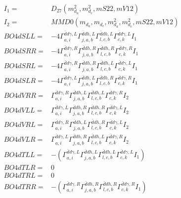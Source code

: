 \documentclass[A4,landscape]{article}
\begin{document}
\begin{align} 
I_1 = & D_{27}(m^2_{d_{{a}}}, m^2_{d_{{c}}}, mS22, mV12) \\ 
I_2 = & MMD0(m_{d_{{a}}}, m_{d_{{c}}}, m^2_{d_{{a}}}, m^2_{d_{{c}}}, mS22, mV12) \\ 
  BO4dSLL= & -4  \Gamma^{\bar{d}d \gamma ,L}_{a, i} \Gamma^{\bar{d}d h ,L}_{j, a, b} \Gamma^{\bar{d}d h ,L}_{l, c, b} \Gamma^{\bar{d}d \gamma ,L}_{c, k} I_1 \\ 
  BO4dSRR= & -4  \Gamma^{\bar{d}d \gamma ,R}_{a, i} \Gamma^{\bar{d}d h ,R}_{j, a, b} \Gamma^{\bar{d}d h ,R}_{l, c, b} \Gamma^{\bar{d}d \gamma ,R}_{c, k} I_1 \\ 
  BO4dSRL= & -4  \Gamma^{\bar{d}d \gamma ,R}_{a, i} \Gamma^{\bar{d}d h ,R}_{j, a, b} \Gamma^{\bar{d}d h ,L}_{l, c, b} \Gamma^{\bar{d}d \gamma ,L}_{c, k} I_1 \\ 
  BO4dSLR= & -4  \Gamma^{\bar{d}d \gamma ,L}_{a, i} \Gamma^{\bar{d}d h ,L}_{j, a, b} \Gamma^{\bar{d}d h ,R}_{l, c, b} \Gamma^{\bar{d}d \gamma ,R}_{c, k} I_1 \\ 
  BO4dVRR= &  \Gamma^{\bar{d}d \gamma ,R}_{a, i} \Gamma^{\bar{d}d h ,L}_{j, a, b} \Gamma^{\bar{d}d h ,L}_{l, c, b} \Gamma^{\bar{d}d \gamma ,R}_{c, k} I_2 \\ 
  BO4dVLL= &  \Gamma^{\bar{d}d \gamma ,L}_{a, i} \Gamma^{\bar{d}d h ,R}_{j, a, b} \Gamma^{\bar{d}d h ,R}_{l, c, b} \Gamma^{\bar{d}d \gamma ,L}_{c, k} I_2 \\ 
  BO4dVRL= &  \Gamma^{\bar{d}d \gamma ,R}_{a, i} \Gamma^{\bar{d}d h ,L}_{j, a, b} \Gamma^{\bar{d}d h ,R}_{l, c, b} \Gamma^{\bar{d}d \gamma ,L}_{c, k} I_2 \\ 
  BO4dVLR= &  \Gamma^{\bar{d}d \gamma ,L}_{a, i} \Gamma^{\bar{d}d h ,R}_{j, a, b} \Gamma^{\bar{d}d h ,L}_{l, c, b} \Gamma^{\bar{d}d \gamma ,R}_{c, k} I_2 \\ 
  BO4dTLL= & -( \Gamma^{\bar{d}d \gamma ,L}_{a, i} \Gamma^{\bar{d}d h ,L}_{j, a, b} \Gamma^{\bar{d}d h ,L}_{l, c, b} \Gamma^{\bar{d}d \gamma ,L}_{c, k} I_1) \\ 
  BO4dTLR= & 0 \\ 
  BO4dTRL= & 0 \\ 
  BO4dTRR= & -( \Gamma^{\bar{d}d \gamma ,R}_{a, i} \Gamma^{\bar{d}d h ,R}_{j, a, b} \Gamma^{\bar{d}d h ,R}_{l, c, b} \Gamma^{\bar{d}d \gamma ,R}_{c, k} I_1) \\ 
\end{align} 
\end{document}
